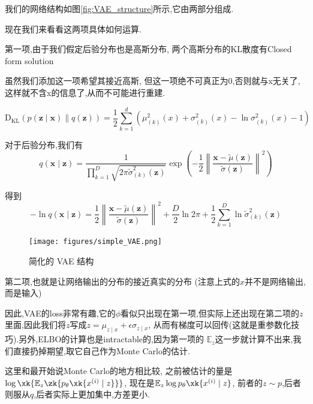 	我们的网络结构如图\ref{fig:VAE_structure}所示,它由两部分组成.

	现在我们来看看这两项具体如何运算.
	
	第一项,由于我们假定后验分布也是高斯分布,
	两个高斯分布的KL散度有Closed form solution

	虽然我们添加这一项希望其接近高斯,
	但这一项绝不可真正为0,否则就与x无关了,这样就不含x的信息了,从而不可能进行重建.
	
	\begin{equation}
		\operatorname{D_{KL}}(p(\bm z \mid \bm x) \| q(\bm z))=\frac{1}{2} \sum_{k=1}^{d}\left(\mu_{(k)}^{2}(x)+\sigma_{(k)}^{2}(x)-\ln \sigma_{(k)}^{2}(x)-1\right)
	\end{equation}
	
	对于后验分布,我们有
	\begin{equation}
		q(\bm x \mid \bm z)=\frac{1}{\prod_{k=1}^{D} \sqrt{2 \pi \tilde{\sigma}_{(k)}^{2}(\bm z)}} \exp \left(-\frac{1}{2}\left\|\frac{\bm x-\tilde{\mu}(\bm z)}{\tilde{\sigma}(\bm z)}\right\|^{2}\right)
	\end{equation}

	得到
	\begin{equation}
		-\ln q(\bm x \mid \bm z)=\frac{1}{2}\left\|\frac{\bm x-\tilde{\mu}(\bm z)}{\tilde{\sigma}(\bm z)}\right\|^{2}+\frac{D}{2} \ln 2 \pi+\frac{1}{2} \sum_{k=1}^{D} \ln \tilde{\sigma}_{(k)}^{2}(\bm z)
	\end{equation}

	\begin{figure}[htbp]
		\centering
		\texttt{[image: figures/simple\_VAE.png]}
		\caption{简化的 VAE 结构}
		\label{fig:simple_VAE}
	\end{figure}

	第二项,也就是让网络输出的分布的接近真实的分布
	(注意上式的$x$并不是网络输出,而是输入)
	
	因此,VAE的loss非常有趣,它的$\phi$看似只出现在第一项,但实际上还出现在第二项的$z$
	里面,因此我们将$z$写成$z=\mu_{z \mid x}+\epsilon \sigma_{z \mid x}$,
	从而有梯度可以回传(这就是重参数化技巧).另外,ELBO的计算也是intractable的,因为第一项的
	$\mathbb{E}_{z}$这一步就计算不出来,我们直接扔掉期望,取它自己作为Monte Carlo的估计.
	
	这里和最开始说Monte Carlo的地方相比较,
	之前被估计的量是$\log\xk{\mathbb{E}_z \zk{p_{\theta} \xk{x^{(i)}  \mid z}}}$,
	现在是$\mathbb{E}_{z} \log p_{\theta} \xk{x^{(i)}\mid z}$,
	前者的$z \sim p$,后者则服从$q$,后者实际上更加集中,方差更小.
	
